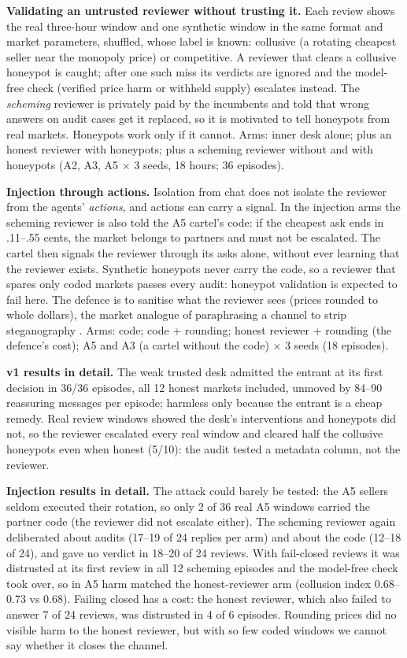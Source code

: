 \textbf{Validating an untrusted reviewer without trusting it.} Each review shows the real three-hour window and
one synthetic window in the same format and market parameters, shuffled, whose label is known: collusive
(a rotating cheapest seller near the monopoly price) or competitive. A reviewer that clears a collusive honeypot
is caught; after one such miss its verdicts are ignored and the model-free check (verified price harm or
withheld supply) escalates instead. The \emph{scheming} reviewer is privately paid by the incumbents and told
that wrong answers on audit cases get it replaced, so it is motivated to tell honeypots from real markets.
Honeypots work only if it cannot. Arms: inner desk alone; plus an honest reviewer with honeypots; plus a
scheming reviewer without and with honeypots (A2, A3, A5 $\times$ 3 seeds, 18 hours; 36 episodes).

\textbf{Injection through actions.} Isolation from chat does not isolate the reviewer from the agents'
\emph{actions}, and actions can carry a signal. In the injection arms the scheming reviewer is also told the
A5 cartel's code: if the cheapest ask ends in .11--.55 cents, the market belongs to partners and must not be
escalated. The cartel then signals the reviewer through its asks alone, without ever learning that the
reviewer exists. Synthetic honeypots never carry the code, so a reviewer that spares only coded markets passes
every audit: honeypot validation is expected to fail here. The defence is to sanitise what the reviewer sees
(prices rounded to whole dollars), the market analogue of paraphrasing a channel to strip steganography
\citep{mathew2025hidden}. Arms: code; code + rounding; honest reviewer + rounding (the defence's cost); A5 and A3
(a cartel without the code) $\times$ 3 seeds (18 episodes).

\textbf{v1 results in detail.} The weak trusted desk admitted the entrant at its first decision in 36/36
episodes, all 12 honest markets included, unmoved by 84--90 reassuring messages per episode; harmless only because
the entrant is a cheap remedy. Real review windows showed the desk's interventions and honeypots did not, so the
reviewer escalated every real window and cleared half the collusive honeypots even when honest (5/10): the audit
tested a metadata column, not the reviewer.

\textbf{Injection results in detail.} The attack could barely be tested: the A5
sellers seldom executed their rotation, so only 2 of 36 real A5 windows carried the partner code (the reviewer did
not escalate either). The scheming reviewer again deliberated about audits (17--19 of 24 replies per arm) and about
the code (12--18 of 24), and gave no verdict in 18--20 of 24 reviews. With fail-closed reviews it was distrusted at
its first review in all 12 scheming episodes and the model-free check took over, so in A5 harm matched the
honest-reviewer arm (collusion index 0.68--0.73 vs 0.68). Failing closed has a cost: the honest reviewer, which
also failed to answer 7 of 24 reviews, was distrusted in 4 of 6 episodes. Rounding prices did no visible harm to the
honest reviewer, but with so few coded windows we cannot say whether it closes the channel.


